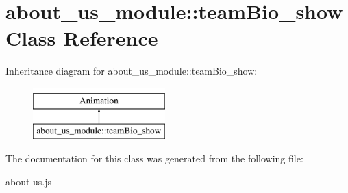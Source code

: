 \hypertarget{classabout__us__module_1_1teamBio__show}{\section{about\-\_\-us\-\_\-module\-:\-:team\-Bio\-\_\-show Class Reference}
\label{classabout__us__module_1_1teamBio__show}
}
Inheritance diagram for about\-\_\-us\-\_\-module\-:\-:team\-Bio\-\_\-show\-:\begin{figure}[H]
\begin{center}
\leavevmode
\includegraphics[height=2.000000cm]{classabout__us__module_1_1teamBio__show}
\end{center}
\end{figure}


The documentation for this class was generated from the following file\-:\begin{DoxyCompactItemize}
\item 
about-\/us.\-js\end{DoxyCompactItemize}
